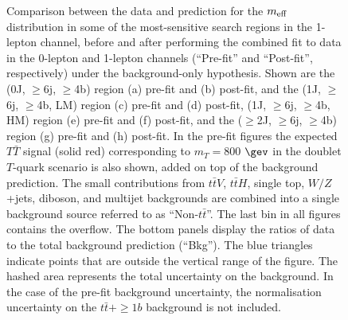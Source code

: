 \begin{figure}[p!]
\begin{subfigure}{0.24\textwidth}
  \caption{}
  \label{}
\end{subfigure}
\captionsetup{width=0.85\textwidth} \caption{\small Comparison between the data and prediction for the $m_{\rm eff}$ distribution in some of the most-sensitive search regions in the 1-lepton channel,
before and after performing the combined fit to data in the 0-lepton and 1-lepton channels (``Pre-fit'' and ``Post-fit'', respectively) under the background-only hypothesis. Shown are the (0J, $\geq$6j, $\geq$4b) region (a) pre-fit and (b) post-fit,  and the (1J, $\geq$6j, $\geq$4b, LM) region (c) pre-fit and (d) post-fit, (1J, $\geq$6j, $\geq$4b, HM) region (e) pre-fit and (f) post-fit,  and the ($\geq$2J, $\geq$6j, $\geq$4b) region (g) pre-fit and (h) post-fit.
In the pre-fit figures the expected $T\bar{T}$ signal (solid red) corresponding to $m_{T}=800$ $\gev$ in the doublet $T$-quark scenario is also shown, added on top of the background prediction. The small contributions from $t\bar{t}V$, $t\bar{t} H$, single top, $W/Z$+jets, diboson, and multijet backgrounds are combined into a single background source  referred to as ``Non-$t\bar{t}$''. The last bin in all figures contains the overflow. The bottom panels display the ratios of data to the total background prediction (``Bkg''). The blue triangles indicate points that are outside the vertical range of the figure. The hashed area represents the total uncertainty on the background. In the case of the pre-fit background uncertainty, the normalisation uncertainty on the $t\bar{t}+\ge1b$ background is not included.}
\label{sec:vlq:fig:meff1}
\end{figure}


